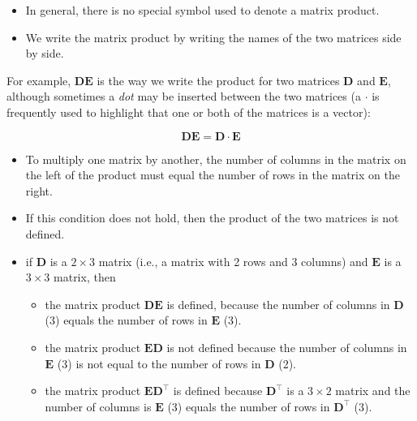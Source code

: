 \documentclass[xcolor={table}]{beamer}
\begin{document}
\begin{frame}
\begin{itemize}
	\item In general, there is no special symbol used to denote a matrix product. 
	\item We write the matrix product by writing the names of the two matrices side by side. 
\end{itemize}
\begin{example}
	For example, $\mathbf{DE}$ is the way we write the product for two matrices $\mathbf{D}$ and $\mathbf{E}$, although sometimes a \emph{dot} may be inserted between the two matrices (a $\cdot$ is frequently used to highlight that one or both of the matrices is a vector):
 
\begin{equation*}
\mathbf{DE} = \mathbf{D} \cdot \mathbf{E}
\end{equation*}
\end{example}
\end{frame}

\begin{frame}
\begin{itemize}
\item To multiply one matrix by another, the number of columns in the matrix on the left of the product must equal the number of rows in the matrix on the right. 
\item If this condition does not hold, then the product of the two matrices is not defined. 
\end{itemize}
\end{frame}
\begin{frame}
\begin{example}
\begin{itemize}
	\item if $\mathbf{D}$ is a $2 \times 3$ matrix (i.e., a matrix with 2 rows and 3 columns) and  $\mathbf{E}$ is a $3 \times 3$ matrix, then
	\begin{itemize}
		\item the matrix product $\mathbf{DE}$ is defined, because the number of columns in $\mathbf{D}$ (3) equals the number of rows in $\mathbf{E}$ (3). 
		\item the matrix product $\mathbf{ED}$ is not defined because the number of columns in $\mathbf{E}$ (3) is not equal to the number of rows in $\mathbf{D}$ (2). 
	\item the matrix product $\mathbf{ED}^\intercal$ is defined because $\mathbf{D}^\intercal$ is a $3\times2$ matrix and the number of columns is $\mathbf{E}$ (3) equals the number of rows in $\mathbf{D}^\intercal$ (3).
	\end{itemize}
\end{itemize}
\end{example}
\end{frame}
\end{document}
